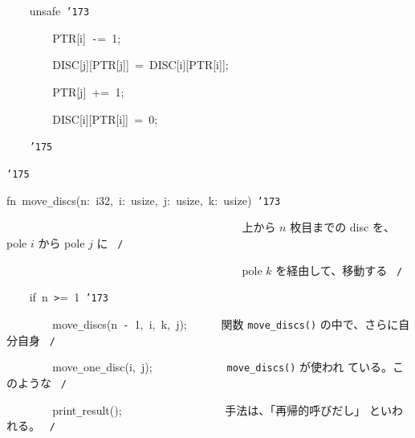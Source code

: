 \documentclass{article}
\begin{document}
\noindent
\mbox{}{\tt\mc \ \ \ \ }unsafe{\tt\mc \ }{\tt\char'173}

\noindent
\mbox{}{\tt\mc \ \ \ \ \ \ \ \ }PTR[i]{\tt\mc \ }{\tt -}={\tt\mc \ }1;

\noindent
\mbox{}{\tt\mc \ \ \ \ \ \ \ \ }DISC[j][PTR[j]]{\tt\mc \ }={\tt\mc \ }DISC[i][PTR[i]];

\noindent
\mbox{}{\tt\mc \ \ \ \ \ \ \ \ }PTR[j]{\tt\mc \ }+={\tt\mc \ }1;

\noindent
\mbox{}{\tt\mc \ \ \ \ \ \ \ \ }DISC[i][PTR[i]]{\tt\mc \ }={\tt\mc \ }0;

\noindent
\mbox{}{\tt\mc \ \ \ \ }{\tt\char'175}

\noindent
\mbox{}{\tt\char'175}

\noindent
\mbox{}\hfill

\noindent
\mbox{}fn{\tt\mc \ }move{\tt\_}discs(n:{\tt\mc \ }i32,{\tt\mc \ }i:{\tt\mc \ }usize,{\tt\mc \ }j:{\tt\mc \ }usize,{\tt\mc \ }k:{\tt\mc \ }usize){\tt\mc \ }{\tt\char'173}

\noindent
\mbox{}{\tt\mc \ \ \ \ \ \ \ \ }{\tt\mc \ \ \ \ \ \ \ \ }{\tt\mc \ \ \ \ \ \ \ \ }{\tt\mc \ \ \ \ \ \ \ \ }{\tt\mc \ \ \ \ \ \ \ \ }\rm\mc {\tt /}{\tt *}\  {}上から $n$ 枚目までの disc
					   を、pole $i$ から pole $j$ に
					   \hfill \rm\mc \ {\tt *}{\tt /}
\tt\mc 

\noindent
\mbox{}{\tt\mc \ \ \ \ \ \ \ \ }{\tt\mc \ \ \ \ \ \ \ \ }{\tt\mc \ \ \ \ \ \ \ \ }{\tt\mc \ \ \ \ \ \ \ \ }{\tt\mc \ \ \ \ \ \ \ \ }\rm\mc {\tt /}{\tt *}\  {}pole $k$ を経由して、移動する
					   \hfill \rm\mc \ {\tt *}{\tt /}
\tt\mc 

\noindent
\mbox{}{\tt\mc \ \ \ \ }if{\tt\mc \ }n{\tt\mc \ }{\tt >}={\tt\mc \ }1{\tt\mc \ }{\tt\char'173}

\noindent
\mbox{}{\tt\mc \ \ \ \ \ \ \ \ }move{\tt\_}discs(n{\tt\mc \ }{\tt -}{\tt\mc \ }1,{\tt\mc \ }i,{\tt\mc \ }k,{\tt\mc \ }j);{\tt\mc \ \ \ \ \ }\rm\mc {\tt /}{\tt *}\  {}関数 {\tt move\_discs()}
					   の中で、さらに自分自身 \hfill \rm\mc \ {\tt *}{\tt /}
\tt\mc 

\noindent
\mbox{}{\tt\mc \ \ \ \ \ \ \ \ }move{\tt\_}one{\tt\_}disc(i,{\tt\mc \ }j);{\tt\mc \ \ \ \ }{\tt\mc \ \ \ \ \ \ \ \ }\rm\mc {\tt /}{\tt *}\  {}{\tt move\_discs()} が使われ
					   ている。このような \hfill \rm\mc \ {\tt *}{\tt /}
\tt\mc 

\noindent
\mbox{}{\tt\mc \ \ \ \ \ \ \ \ }print{\tt\_}result();{\tt\mc \ }{\tt\mc \ \ \ \ \ \ \ \ }{\tt\mc \ \ \ \ \ \ \ \ }\rm\mc {\tt /}{\tt *}\  {}手法は、「再帰的呼びだし」
					   といわれる。 \hfill \rm\mc \ {\tt *}{\tt /}
\tt\mc 
\end{document}

